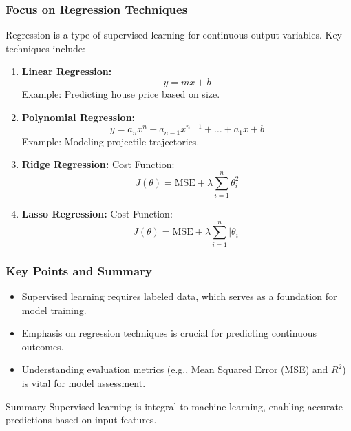 \documentclass[aspectratio=169]{beamer}
\begin{document}
\begin{frame}[fragile]
    \frametitle{Focus on Regression Techniques}
    Regression is a type of supervised learning for continuous output variables. Key techniques include:
    \begin{enumerate}
        \item \textbf{Linear Regression:}
        \begin{equation}
            y = mx + b
        \end{equation}
        Example: Predicting house price based on size.
        
        \item \textbf{Polynomial Regression:}
        \begin{equation}
            y = a_nx^n + a_{n-1}x^{n-1} + \ldots + a_1x + b
        \end{equation}
        Example: Modeling projectile trajectories.

        \item \textbf{Ridge Regression:}
        Cost Function:
        \begin{equation}
            J(\theta) = \text{MSE} + \lambda \sum_{i=1}^{n} \theta_i^2
        \end{equation}
        
        \item \textbf{Lasso Regression:}
        Cost Function:
        \begin{equation}
            J(\theta) = \text{MSE} + \lambda \sum_{i=1}^{n} |\theta_i|
        \end{equation}
    \end{enumerate}
\end{frame}

\begin{frame}[fragile]
    \frametitle{Key Points and Summary}
    \begin{itemize}
        \item Supervised learning requires labeled data, which serves as a foundation for model training.
        \item Emphasis on regression techniques is crucial for predicting continuous outcomes.
        \item Understanding evaluation metrics (e.g., Mean Squared Error (MSE) and $R^2$) is vital for model assessment.
    \end{itemize}
    
    \begin{block}{Summary}
        Supervised learning is integral to machine learning, enabling accurate predictions based on input features.
    \end{block}
\end{frame}
\end{document}
